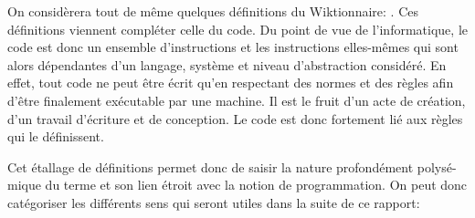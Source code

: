 \documentclass[12pt]{article} %
\begin{document}
On considèrera tout de même quelques définitions du Wiktionnaire:
\cite{noauthor_undated-vw}. Ces définitions viennent compléter celle du code. Du point de vue de l'informatique, le code est donc un ensemble d'instructions et les instructions elles-mêmes qui sont alors dépendantes d'un langage, système et niveau d'abstraction considéré. En effet, tout code ne peut être écrit qu'en respectant des normes et des règles afin d'être finalement exécutable par une machine. Il est le fruit d'un acte de création, d'un travail d'écriture et de conception. Le code est donc fortement lié aux règles qui le définissent. 

Cet étallage de définitions permet donc de saisir la nature profondément polysé-mique du terme et son lien étroit avec la notion de programmation. On peut donc catégoriser les différents sens qui seront utiles dans la suite de ce rapport:
\end{document}
